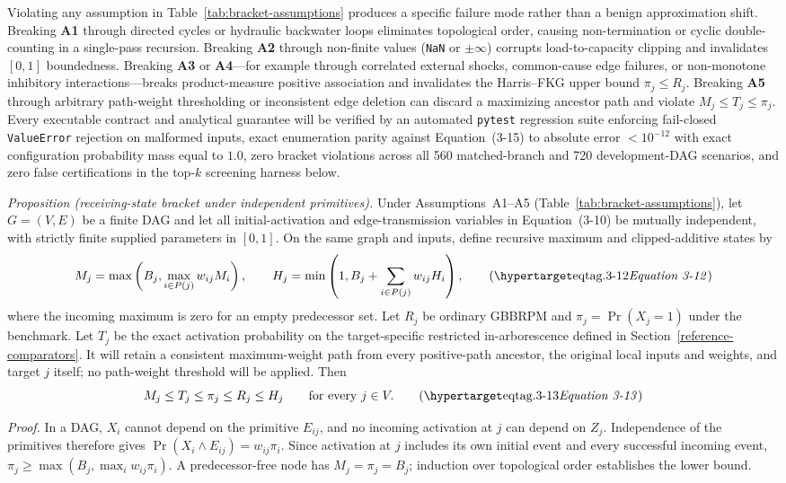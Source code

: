 Violating any assumption in Table~\ref{tab:bracket-assumptions} produces a
specific failure mode rather than a benign approximation shift. Breaking
\textbf{A1} through directed cycles or hydraulic backwater loops eliminates
topological order, causing non-termination or cyclic double-counting in a
single-pass recursion. Breaking \textbf{A2} through non-finite values
(\texttt{NaN} or $\pm\infty$) corrupts load-to-capacity clipping and invalidates
$[0,1]$ boundedness. Breaking \textbf{A3} or \textbf{A4}---for example through
correlated external shocks, common-cause edge failures, or non-monotone
inhibitory interactions---breaks product-measure positive association and
invalidates the Harris--FKG upper bound $\pi_j\le R_j$. Breaking \textbf{A5}
through arbitrary path-weight thresholding or inconsistent edge deletion can
discard a maximizing ancestor path and violate $M_j\le T_j\le\pi_j$. Every
executable contract and analytical guarantee will be verified by an automated
\texttt{pytest} regression suite enforcing fail-closed \texttt{ValueError}
rejection on malformed inputs, exact enumeration parity against
Equation~(3-15) to absolute error $<10^{-12}$ with exact configuration
probability mass equal to $1.0$, zero bracket violations across all 560
matched-branch and 720 development-DAG scenarios, and zero false
certifications in the top-$k$ screening harness below.

\textit{Proposition (receiving-state bracket under independent primitives).}
Under Assumptions~A1--A5 (Table~\ref{tab:bracket-assumptions}), let
$G=(V,E)$ be a finite DAG and let all initial-activation and
edge-transmission variables in Equation~(3-10) be mutually independent, with
strictly finite supplied parameters in $[0,1]$. On the same graph and inputs,
define recursive maximum and clipped-additive states by
\[
M_j=\max\left(B_j,\max_{i\in P(j)}w_{ij}M_i\right),\qquad
H_j=\min\left(1,B_j+\sum_{i\in P(j)}w_{ij}H_i\right),
\eqtag{3-12}
\]
where the incoming maximum is zero for an empty predecessor set. Let $R_j$
be ordinary GBBRPM and $\pi_j=\Pr(X_j=1)$ under the benchmark. Let $T_j$
be the exact activation probability on the target-specific restricted
in-arborescence defined in Section~\ref{reference-comparators}. It will
retain a consistent maximum-weight path from every positive-path ancestor,
the original local inputs and weights, and target $j$ itself; no path-weight
threshold will be applied. Then
\[
M_j\le T_j\le\pi_j\le R_j\le H_j\qquad\text{for every }j\in V.
\eqtag{3-13}
\]

\textit{Proof.} In a DAG, $X_i$ cannot depend on the primitive $E_{ij}$,
and no incoming activation at $j$ can depend on $Z_j$. Independence of
the primitives therefore gives
$\Pr(X_i\land E_{ij})=w_{ij}\pi_i$. Since activation at $j$ includes
its own initial event and every successful incoming event,
$\pi_j\ge\max(B_j,\max_i w_{ij}\pi_i)$. A predecessor-free node has
$M_j=\pi_j=B_j$; induction over topological order establishes the lower bound.


